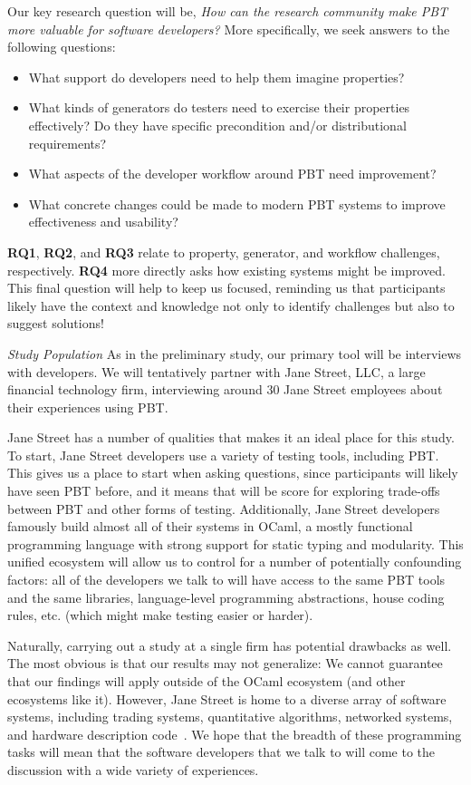 Our key research question will be, \emph{How can the research community make PBT 
more valuable for software developers?} More specifically, we seek
answers to the following questions:

\begin{itemize}[noitemsep,leftmargin=4em]
\item[\bf RQ1.] What support do developers need to help them imagine properties?
\item[\bf RQ2.] What kinds of generators do testers need to exercise their
  properties effectively? Do they have specific precondition and/or distributional
  requirements?
\item[\bf RQ3.] What aspects of the developer workflow around PBT need improvement?
\item[\bf RQ4.] What concrete changes could be made to modern PBT systems
  to improve effectiveness and usability?
\end{itemize}
{\bf RQ1}, {\bf RQ2}, and {\bf RQ3} relate to property,
generator, and workflow challenges, respectively.
{\bf RQ4} more directly asks how existing systems might
be improved. This final question will help to keep us focused,
reminding us that participants likely have the context and knowledge not
only to identify challenges but also to suggest
solutions!

\textit{Study Population}
As in the preliminary study, our primary tool will be interviews with
developers. We will tentatively partner with Jane Street, LLC, a large
financial technology firm,
interviewing around 30 Jane Street employees about their experiences using PBT.

Jane Street has a number of qualities that makes it an ideal place for
this study. To start, Jane Street developers use
a variety of testing tools, including PBT. This gives us a place to start
when asking questions, since participants will likely have seen PBT before,
and it means that will be score for exploring trade-offs between PBT and
other forms of testing.
Additionally, Jane Street developers famously build almost all of their
systems in OCaml, a mostly functional programming language with strong support
for static typing and modularity. This unified ecosystem
will allow
us to control for a number of potentially confounding factors: all of the
developers we talk to will have access to the same PBT tools and the same
libraries, language-level programming abstractions, house coding rules,
etc. (which might make testing easier or harder).

Naturally, carrying out a study at a single firm has potential drawbacks as
well. The most obvious is that our results may not generalize: We
cannot guarantee that our findings will apply outside of the OCaml ecosystem (and
other ecosystems like it). However, Jane Street is home to a diverse array of
software systems, including trading systems, quantitative
algorithms, networked systems, and hardware description code~\cite{signalsandthreads}.
We hope that the breadth of these programming tasks will mean that the software
developers that we talk to will come to the discussion with a wide variety of
experiences.

